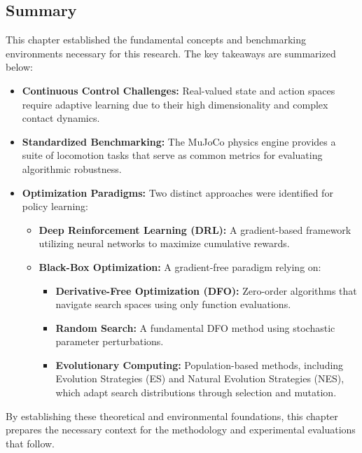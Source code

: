 \subsection{Summary}

This chapter established the fundamental concepts and benchmarking environments necessary for this research. The key takeaways are summarized below:

\begin{itemize}
    \item \textbf{Continuous Control Challenges:} Real-valued state and action spaces require adaptive learning due to their high dimensionality and complex contact dynamics.
    \item \textbf{Standardized Benchmarking:} The MuJoCo physics engine provides a suite of locomotion tasks that serve as common metrics for evaluating algorithmic robustness.
    \item \textbf{Optimization Paradigms:} Two distinct approaches were identified for policy learning:
    \begin{itemize}
        \item \textbf{Deep Reinforcement Learning (DRL):} A gradient-based framework utilizing neural networks to maximize cumulative rewards.
        \item \textbf{Black-Box Optimization:} A gradient-free paradigm relying on:
        \begin{itemize}
            \item \textbf{Derivative-Free Optimization (DFO):} Zero-order algorithms that navigate search spaces using only function evaluations.
            \item \textbf{Random Search:} A fundamental DFO method using stochastic parameter perturbations.
            \item \textbf{Evolutionary Computing:} Population-based methods, including Evolution Strategies (ES) and Natural Evolution Strategies (NES), which adapt search distributions through selection and mutation.
        \end{itemize}
    \end{itemize}
\end{itemize}

By establishing these theoretical and environmental foundations, this chapter prepares the necessary context for the methodology and experimental evaluations that follow.

\clearpage
\null %
\clearpage